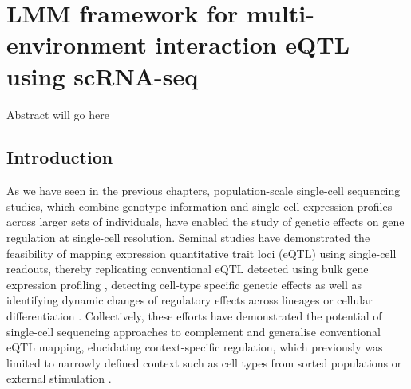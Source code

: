 
\chapter{LMM framework for multi-environment interaction eQTL using scRNA-seq}
\label{chapter6}

Abstract will go here

\newpage





\section{Introduction} 

As we have seen in the previous chapters, population-scale single-cell sequencing studies, which combine genotype information and single cell expression profiles across larger sets of individuals, have enabled the study of genetic effects on gene regulation at single-cell resolution. 
Seminal studies have demonstrated the feasibility of mapping expression quantitative trait loci (eQTL) using single-cell readouts, thereby replicating conventional eQTL detected using bulk gene expression profiling \cite{cuomo2020single, van2018single}, detecting cell-type specific genetic effects \cite{van2018single} as well as identifying dynamic changes of regulatory effects across lineages or cellular differentiation \cite{cuomo2020single}. 
Collectively, these efforts have demonstrated the potential of single-cell sequencing approaches to complement and generalise conventional eQTL mapping, elucidating context-specific regulation, which previously was limited to narrowly defined context such as cell types from sorted populations \cite{fairfax2012genetics} or external stimulation \cite{fairfax2014innate}.\\

